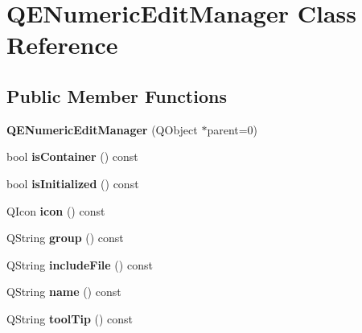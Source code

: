 \hypertarget{classQENumericEditManager}{
\section{QENumericEditManager Class Reference}
\label{classQENumericEditManager}
}
\subsection*{Public Member Functions}
\begin{DoxyCompactItemize}
\item 
\hypertarget{classQENumericEditManager_ac4a8e62c643a04468ae0a1fa55bdeb44}{
{\bfseries QENumericEditManager} (QObject $\ast$parent=0)}
\label{classQENumericEditManager_ac4a8e62c643a04468ae0a1fa55bdeb44}

\item 
\hypertarget{classQENumericEditManager_a2f4c3c4c377af68ae44ff4b9f2f17dfb}{
bool {\bfseries isContainer} () const }
\label{classQENumericEditManager_a2f4c3c4c377af68ae44ff4b9f2f17dfb}

\item 
\hypertarget{classQENumericEditManager_a611a5bdc4d10db3768f86b43d9bc3525}{
bool {\bfseries isInitialized} () const }
\label{classQENumericEditManager_a611a5bdc4d10db3768f86b43d9bc3525}

\item 
\hypertarget{classQENumericEditManager_a7cdca478cd10ffd15355e1e50b0e33fa}{
QIcon {\bfseries icon} () const }
\label{classQENumericEditManager_a7cdca478cd10ffd15355e1e50b0e33fa}

\item 
\hypertarget{classQENumericEditManager_a554a81e0fa2b74689b4dfe981e1894db}{
QString {\bfseries group} () const }
\label{classQENumericEditManager_a554a81e0fa2b74689b4dfe981e1894db}

\item 
\hypertarget{classQENumericEditManager_a2ed39810ab1d0af37aeb7961214ab828}{
QString {\bfseries includeFile} () const }
\label{classQENumericEditManager_a2ed39810ab1d0af37aeb7961214ab828}

\item 
\hypertarget{classQENumericEditManager_a34f847dd287946a880f595f0f95c8650}{
QString {\bfseries name} () const }
\label{classQENumericEditManager_a34f847dd287946a880f595f0f95c8650}

\item 
\hypertarget{classQENumericEditManager_a65afd86849b7cf1286639a830cabf5bc}{
QString {\bfseries toolTip} () const }
\label{classQENumericEditManager_a65afd86849b7cf1286639a830cabf5bc}


\end{DoxyCompactItemize}
